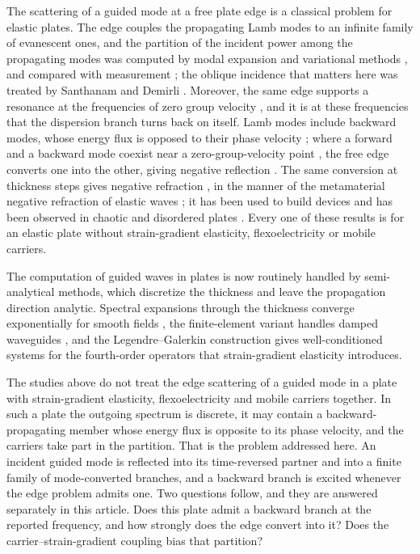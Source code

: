 The scattering of a guided mode at a free plate edge is a classical problem for
elastic plates.  The edge couples the propagating Lamb modes to an infinite
family of evanescent ones, and the partition of the incident power among the
propagating modes was computed by modal expansion and variational methods
\cite{torvik1967reflection,auld1977variational,gregory1983reflection}, and
compared with measurement \cite{morvan2003lamb}; the oblique incidence that
matters here was treated by Santhanam and Demirli \cite{santhanam2013reflection}.
Moreover, the same edge supports a resonance at the frequencies of zero group velocity
\cite{prada2005laser,clorennec2007local,prada2008power,ces2011edge}, and it is at
these frequencies that the dispersion branch turns back on itself.  Lamb modes include backward modes, whose energy flux is opposed to their phase velocity
\cite{meitzler1965backward}; where a forward and a backward mode coexist near a
zero-group-velocity point \cite{prada2008local}, the free edge converts one
into the other, giving negative reflection
\cite{germano2012anomalous,gerardin2016negative,veres2016broad}.  The same
conversion at thickness steps gives negative refraction
\cite{bramhavar2011negative,philippe2015focusing}, in the manner of the
metamaterial negative refraction of elastic waves \cite{zhu2014negative}; it has
been used to build devices \cite{legrand2021cloaking} and has been observed in
chaotic and disordered plates \cite{gerardin2019chaotic}.  Every one of these
results is for an elastic plate without strain-gradient elasticity,
flexoelectricity or mobile carriers.

The computation of guided waves in plates is now routinely handled by semi-analytical
methods, which discretize the thickness and leave the propagation direction
analytic.  Spectral expansions through the thickness converge exponentially for
smooth fields \cite{adamou2004spectral,quintanilla2015modeling}, the
finite-element variant handles damped waveguides \cite{bartoli2006modeling}, and
the Legendre--Galerkin construction \cite{shen1994efficient} gives well-conditioned
systems for the fourth-order operators that strain-gradient elasticity
introduces.

The studies above do not treat the edge scattering of a guided mode in a
plate with strain-gradient elasticity, flexoelectricity and mobile carriers
together.  In such a plate the outgoing spectrum is discrete, it may contain a
backward-propagating member whose energy flux is opposite to its phase velocity, and the
carriers take part in the partition.  That is the problem addressed here.  An
incident guided mode is reflected into its time-reversed partner and into a finite
family of mode-converted branches, and a backward branch is excited whenever the
edge problem admits one.  Two questions follow, and they are answered separately in
this article.  Does this plate admit a backward branch at the reported
frequency, and how strongly does the edge convert into it?  Does the
carrier--strain-gradient coupling bias that partition?

